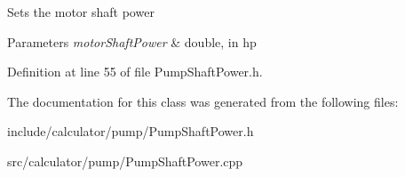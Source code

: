 Sets the motor shaft power


\begin{DoxyParams}{Parameters}
{\em motor\+Shaft\+Power} & double, in hp \\
\hline
\end{DoxyParams}


Definition at line 55 of file Pump\+Shaft\+Power.\+h.



The documentation for this class was generated from the following files\+:\begin{DoxyCompactItemize}
\item 
include/calculator/pump/Pump\+Shaft\+Power.\+h\item 
src/calculator/pump/Pump\+Shaft\+Power.\+cpp\end{DoxyCompactItemize}
